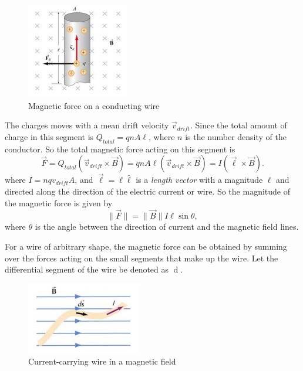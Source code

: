 \begin{figure}[h!]
    \centering
    \includegraphics{notes/images/Magnetic-Field-Wire-2.JPG}
    \caption{Magnetic force on a conducting wire}
    \label{fig:magnetic-field-wire-2}
\end{figure}
\FloatBarrier

The charges moves with a mean drift velocity $\vec{v}_{drift}$. Since the total amount of charge in this segment is $Q_{total} = qnA\ell$, where $n$ is the number density of the conductor. So the total magnetic force acting on this segment is
\begin{equation}
    \vec{F} = Q_{total} (\vec{v}_{drift} \times \vec{B}) = qnA\ell (\vec{v}_{drift} \times \vec{B}) = I (\vec{\ell} \times \vec{B}).
\end{equation}
where $I = nqv_{drift}A$, and $\vec{\ell} = \ell \hat{\ell}$ is a \textit{length vector} with a magnitude $\ell$ and directed along the direction of the electric current or wire. So the magnitude of the magnetic force is given by
\begin{equation}
    \| \vec{F} \| = \| \vec{B} \| I \ell \sin \theta,
\end{equation}
where $\theta$ is the angle between the direction of current and the magnetic field lines. 

For a wire of arbitrary shape, the magnetic force can be obtained by summing over the forces acting on the small segments that make up the wire. Let the differential segment of the wire be denoted as $\mathop{\mathrm{d}\vec{s}}$. 

\begin{figure}[h!]
    \centering
    \includegraphics{notes/images/Magnetic-Field-Wire-3.JPG}
    \caption{Current-carrying wire in a magnetic field}
    \label{fig:magnetic-field-wire-3}
\end{figure}
\FloatBarrier

